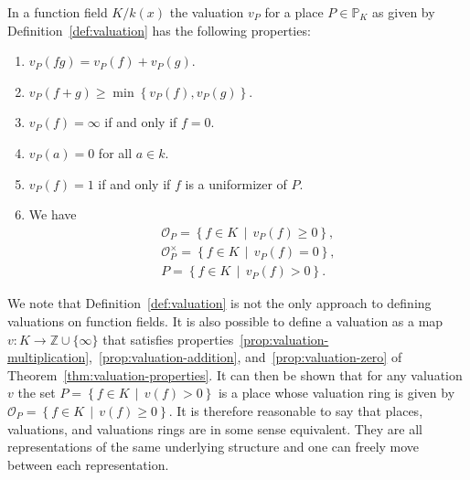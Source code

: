\begin{theorem}%
  \label{thm:valuation-properties}
  In a function field \(K / k(x)\) the valuation \(v_{P}\) for a place \(P \in \mathbb{P}_{K}\) as given by Definition~\ref{def:valuation} has the following properties:
  \begin{enumerate}[label = {(\arabic*)}]
    \item%
      \label{prop:valuation-multiplication}
      \(v_{P}(fg) = v_{P}(f) + v_{P}(g)\).

    \item%
      \label{prop:valuation-addition}
      \(v_{P}(f + g) \geq \min{\left\{v_{P}(f), v_{P}(g)\right\}}\).

    \item%
      \label{prop:valuation-zero}
      \(v_{P}(f) = \infty\) if and only if \(f = 0\).

    \item
      \(v_{P}(a) = 0\) for all \(a \in k\).

    \item
      \(v_{P}(f) = 1\) if and only if \(f\) is a uniformizer of \(P\).

    \item
      We have
      \begin{align*}
        \mathcal{O}_{P} = \left\{ f \in K \,\middle|\, v_{P}(f) \geq 0 \right\},       \\
        \mathcal{O}_{P}^{\times} = \left\{ f \in K \,\middle|\, v_{P}(f) = 0 \right\}, \\
        P = \left\{ f \in K \,\middle|\, v_{P}(f) > 0 \right\}.
      \end{align*}
  \end{enumerate}
\end{theorem}

We note that Definition~\ref{def:valuation} is not the only approach to defining valuations on function fields. It is also possible to define a valuation as a map \(v: K \to \mathbb{Z} \cup \{\infty\}\) that satisfies properties~\ref{prop:valuation-multiplication},~\ref{prop:valuation-addition}, and~\ref{prop:valuation-zero} of Theorem~\ref{thm:valuation-properties}. It can then be shown that for any valuation \(v\) the set \(P = \left\{ f \in K \,\middle|\, v(f) > 0 \right\}\) is a place whose valuation ring is given by \(\mathcal{O}_{P} = \left\{ f \in K \,\middle|\, v(f) \geq 0 \right\}\). It is therefore reasonable to say that places, valuations, and valuations rings are in some sense equivalent. They are all representations of the same underlying structure and one can freely move between each representation.

